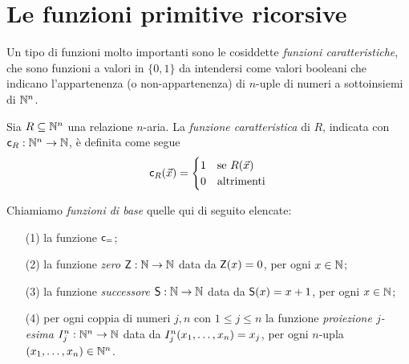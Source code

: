 \documentclass[runningheads,a4paper]{llncs}
\begin{document}
\section{Le funzioni primitive ricorsive}

Un tipo di funzioni molto importanti sono le cosiddette \emph{funzioni caratteristiche}, che sono funzioni a valori in $\{0,1\}$ da intendersi come valori booleani che indicano l'appartenenza (o non-appartenenza) di $n$-uple di numeri a sottoinsiemi di $\mathbb{N}^n$.

\begin{definition}\label{def:fun-car}
Sia $R \subseteq \mathbb{N}^n$ una relazione $n$-aria. La \emph{funzione caratteristica} di $R$, indicata con $\mathsf{c}_{R}: \mathbb{N}^n \to \mathbb{N}$, \`{e} definita come segue
$$
\mathsf{c}_{R}(\vec x) = 
\begin{cases}
1 & \mbox{se } R(\vec x) \\
0 & \mbox{altrimenti} \\
\end{cases}
$$
\end{definition}

\begin{definition}\label{def:bas-fun}
Chiamiamo \emph{funzioni di base} quelle qui di seguito elencate:
\begin{itemize}
\item[(1)] la funzione $\mathsf{c}_{=}$;
\item[(2)] la funzione \emph{zero} $\mathsf{Z}: \mathbb{N} \to \mathbb{N}$ data da $\mathsf{Z}(x) = 0$, per ogni $x \in \mathbb{N}$;
\item[(3)] la funzione \emph{successore} $\mathsf{S}: \mathbb{N} \to \mathbb{N}$ data da $\mathsf{S}(x) = x+1$, per ogni $x \in \mathbb{N}$;
\item[(4)] per ogni coppia di numeri $j,n$ con $1\leq j \leq n$ la funzione \emph{proiezione $j$-esima} $I_{j}^{n}: \mathbb{N}^n \to \mathbb{N}$ data da $I_{j}^{n}(x_1,\ldots,x_n) = x_j$, per ogni $n$-upla $(x_1,\ldots,x_n) \in \mathbb{N}^n$.
\end{itemize}
\end{definition}
\end{document}
